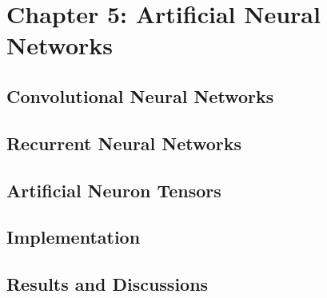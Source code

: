 \chapter{Chapter 5: Artificial Neural Networks} 

\label{Chapter5} 

\section{Convolutional Neural Networks}


\section{Recurrent Neural Networks}

\section{Artificial Neuron Tensors}

\section{Implementation}

\section{Results and Discussions}
